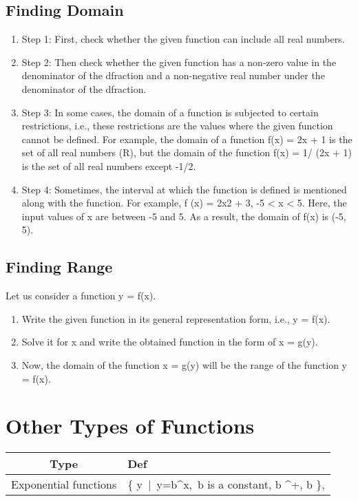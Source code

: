 \documentclass[openany]{book}
\begin{document}
\subsection{Finding Domain}

\begin{enumerate}
	\item Step 1: First, check whether the given function can include all real numbers.
	\item Step 2: Then check whether the given function has a non-zero value in the denominator of the dfraction and a non-negative real number under the denominator of the dfraction.
	\item Step 3: In some cases, the domain of a function is subjected to certain restrictions, i.e., these restrictions are the values where the given function cannot be defined. For example, the domain of a function f(x) = 2x + 1 is the set of all real numbers (R), but the domain of the function f(x) = 1/ (2x + 1) is the set of all real numbers except -1/2.
	\item Step 4: Sometimes, the interval at which the function is defined is mentioned along with the function. For example, f (x) = 2x2 + 3, -5 < x < 5. Here, the input values of x are between -5 and 5. As a result, the domain of f(x) is (-5, 5).
\end{enumerate}

\subsection{Finding Range}

Let us consider a function y = f(x).

\begin{enumerate}

	\item Write the given function in its general representation form, i.e., y = f(x).
	\item Solve it for x and write the obtained function in the form of x = g(y).
	\item Now, the domain of the function x = g(y) will be the range of the function y = f(x).
	      
\end{enumerate}

\section{Other Types of Functions}

\begin{tabular}{|c|L|}
	\hline
	Type                  & Def                                                                                    \\
	\hline
	Exponential functions & \{ y\ |\ y=b^x,\ b is a constant, b \in ^+, b  \},  \\
	\hline
\end{tabular}
\end{document}
